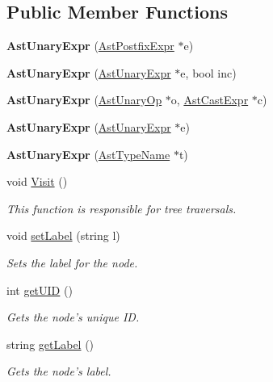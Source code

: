 \subsection*{Public Member Functions}
\begin{DoxyCompactItemize}
\item 
\hypertarget{classAstUnaryExpr_a7afc6e7c4cf309676aa701656c70453a}{{\bfseries Ast\-Unary\-Expr} (\hyperlink{classAstPostfixExpr}{Ast\-Postfix\-Expr} $\ast$e)}\label{classAstUnaryExpr_a7afc6e7c4cf309676aa701656c70453a}

\item 
\hypertarget{classAstUnaryExpr_a82859566c71d787e29263ff3ba013261}{{\bfseries Ast\-Unary\-Expr} (\hyperlink{classAstUnaryExpr}{Ast\-Unary\-Expr} $\ast$e, bool inc)}\label{classAstUnaryExpr_a82859566c71d787e29263ff3ba013261}

\item 
\hypertarget{classAstUnaryExpr_ad71de2cd2c65b31e5f5f5fde4e75fc14}{{\bfseries Ast\-Unary\-Expr} (\hyperlink{classAstUnaryOp}{Ast\-Unary\-Op} $\ast$o, \hyperlink{classAstCastExpr}{Ast\-Cast\-Expr} $\ast$c)}\label{classAstUnaryExpr_ad71de2cd2c65b31e5f5f5fde4e75fc14}

\item 
\hypertarget{classAstUnaryExpr_a22b7c004d42c54c96b40de10cc90a07e}{{\bfseries Ast\-Unary\-Expr} (\hyperlink{classAstUnaryExpr}{Ast\-Unary\-Expr} $\ast$e)}\label{classAstUnaryExpr_a22b7c004d42c54c96b40de10cc90a07e}

\item 
\hypertarget{classAstUnaryExpr_a305b745cf1449c3d3dc4e74dcd768ef1}{{\bfseries Ast\-Unary\-Expr} (\hyperlink{classAstTypeName}{Ast\-Type\-Name} $\ast$t)}\label{classAstUnaryExpr_a305b745cf1449c3d3dc4e74dcd768ef1}

\item 
void \hyperlink{classAstUnaryExpr_ae35427088d6f5c889e8e80573a3750fc}{Visit} ()
\begin{DoxyCompactList}\small\item\em This function is responsible for tree traversals. \end{DoxyCompactList}\item 
void \hyperlink{classAST_a71d680856e95ff89f55d5311a552eba6}{set\-Label} (string l)
\begin{DoxyCompactList}\small\item\em Sets the label for the node. \end{DoxyCompactList}\item 
int \hyperlink{classAST_ab7a5b1d9f1c2de0d98deb356f724a42c}{get\-U\-I\-D} ()
\begin{DoxyCompactList}\small\item\em Gets the node's unique I\-D. \end{DoxyCompactList}\item 
string \hyperlink{classAST_aee029be902fffc927d16ccb03eb922ad}{get\-Label} ()
\begin{DoxyCompactList}\small\item\em Gets the node's label. \end{DoxyCompactList}\end{DoxyCompactItemize}
